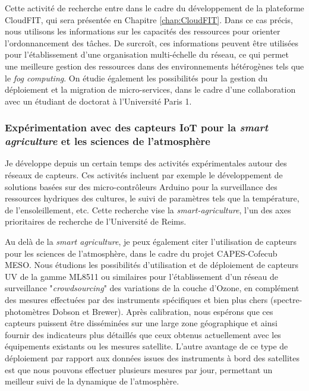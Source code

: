Cette activité de recherche entre dans le cadre du développement de la plateforme CloudFIT, qui sera présentée en Chapitre \ref{chap:CloudFIT}. Dans ce cas précis, nous utilisons les informations sur les capacités des ressources pour orienter l'ordonnancement des tâches. De surcroît, ces informations peuvent être utilisées pour l'établissement d'une  organisation multi-échelle du réseau, ce qui permet une meilleure gestion des ressources dans des environnements hétérogènes tels que le \textit{fog computing}. On étudie également les possibilités pour la gestion du déploiement et la migration de  micro-services, dans le cadre d'une collaboration avec un étudiant de doctorat à l'Université Paris 1. 


\subsubsection*{Expérimentation avec des capteurs IoT pour la \textit{smart agriculture} et les sciences de l'atmosphère}

Je développe depuis un certain temps des activités expérimentales autour des réseaux de capteurs. Ces activités incluent par exemple le développement de solutions basées sur des micro-contrôleurs Arduino pour la surveillance des ressources hydriques des cultures, le suivi de paramètres tels que la température, de l'ensoleillement, etc. Cette recherche vise la \textit{smart-agriculture}, l'un des axes prioritaires de recherche de l'Université de Reims.

Au delà de la \textit{smart agriculture}, je peux également citer l'utilisation de capteurs pour les sciences de l'atmosphère, dans le cadre du projet CAPES-Cofecub MESO. Nous étudions les possibilités d'utilisation et de déploiement de capteurs UV de la gamme ML8511 ou similaires pour l'établissement d'un réseau de surveillance "\textit{crowdsourcing}" des variations de la couche d'Ozone, en complément des mesures effectuées par des instruments spécifiques et bien plus chers (spectre-photomètres Dobson et Brewer). Après calibration, nous espérons que ces capteurs puissent être disséminées sur une large zone géographique et ainsi fournir des indicateurs plus détaillés que ceux obtenus actuellement avec les équipements existants ou les mesures satellite. L'autre avantage de ce type de déploiement par rapport aux données issues des instruments à bord des satellites est que nous pouvons effectuer plusieurs mesures par jour, permettant un meilleur suivi de la dynamique de l'atmosphère.

